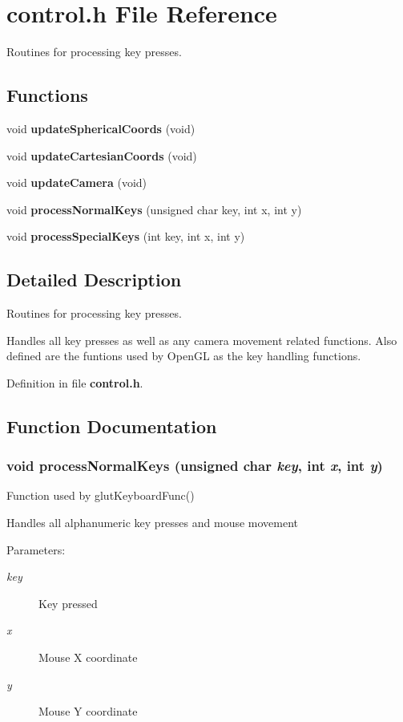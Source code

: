 \section{control.h File Reference}
\label{control_8h}
Routines for processing key presses.  


\subsection*{Functions}
\begin{CompactItemize}
\item 
void {\bf update\-Spherical\-Coords} (void)
\item 
void {\bf update\-Cartesian\-Coords} (void)
\item 
void {\bf update\-Camera} (void)
\item 
void {\bf process\-Normal\-Keys} (unsigned char key, int x, int y)
\item 
void {\bf process\-Special\-Keys} (int key, int x, int y)
\end{CompactItemize}


\subsection{Detailed Description}
Routines for processing key presses. 

Handles all key presses as well as any camera movement related functions. Also defined are the funtions used by Open\-GL as the key handling functions.

Definition in file {\bf control.h}.

\subsection{Function Documentation}
\subsubsection{\setlength{\rightskip}{0pt plus 5cm}void process\-Normal\-Keys (unsigned char {\em key}, int {\em x}, int {\em y})}\label{control_8h_a3}


Function used by glut\-Keyboard\-Func()

Handles all alphanumeric key presses and mouse movement \begin{Desc}
\item[Parameters:]
\begin{description}
\item[{\em key}]Key pressed \item[{\em x}]Mouse X coordinate \item[{\em y}]Mouse Y coordinate \end{description}
\end{Desc}


